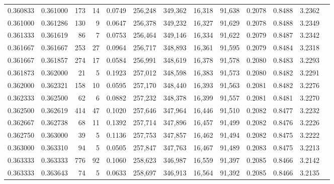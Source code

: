\begin{tabular}{rrrrrrrrrrrrr}
0.360833 & 0.361000 &   173 &  14 &                                     0.0749 & 256,248 & 349,362 &  16,318 &  91,638 & 0.2078 & 0.8488 & 3.2362 \\
0.361000 & 0.361286 &   130 &   9 &                                     0.0647 & 256,378 & 349,232 &  16,327 &  91,629 & 0.2078 & 0.8488 & 3.2349 \\
0.361333 & 0.361619 &    86 &   7 &                                     0.0753 & 256,464 & 349,146 &  16,334 &  91,622 & 0.2079 & 0.8487 & 3.2342 \\
0.361667 & 0.361667 &   253 &  27 &                                     0.0964 & 256,717 & 348,893 &  16,361 &  91,595 & 0.2079 & 0.8484 & 3.2318 \\
0.361667 & 0.361857 &   274 &  17 &                                     0.0584 & 256,991 & 348,619 &  16,378 &  91,578 & 0.2080 & 0.8483 & 3.2293 \\
0.361873 & 0.362000 &    21 &   5 &                                     0.1923 & 257,012 & 348,598 &  16,383 &  91,573 & 0.2080 & 0.8482 & 3.2291 \\
0.362000 & 0.362321 &   158 &  10 &                                     0.0595 & 257,170 & 348,440 &  16,393 &  91,563 & 0.2081 & 0.8482 & 3.2276 \\
0.362333 & 0.362500 &    62 &   6 &                                     0.0882 & 257,232 & 348,378 &  16,399 &  91,557 & 0.2081 & 0.8481 & 3.2270 \\
0.362500 & 0.362619 &   414 &  47 &                                     0.1020 & 257,646 & 347,964 &  16,446 &  91,510 & 0.2082 & 0.8477 & 3.2232 \\
0.362667 & 0.362738 &    68 &  11 &                                     0.1392 & 257,714 & 347,896 &  16,457 &  91,499 & 0.2082 & 0.8476 & 3.2226 \\
0.362750 & 0.363000 &    39 &   5 &                                     0.1136 & 257,753 & 347,857 &  16,462 &  91,494 & 0.2082 & 0.8475 & 3.2222 \\
0.363000 & 0.363310 &    94 &   5 &                                     0.0505 & 257,847 & 347,763 &  16,467 &  91,489 & 0.2083 & 0.8475 & 3.2213 \\
0.363333 & 0.363333 &   776 &  92 &                                     0.1060 & 258,623 & 346,987 &  16,559 &  91,397 & 0.2085 & 0.8466 & 3.2142 \\
0.363333 & 0.363643 &    74 &   5 &                                     0.0633 & 258,697 & 346,913 &  16,564 &  91,392 & 0.2085 & 0.8466 & 3.2135 \\

\end{tabular}
